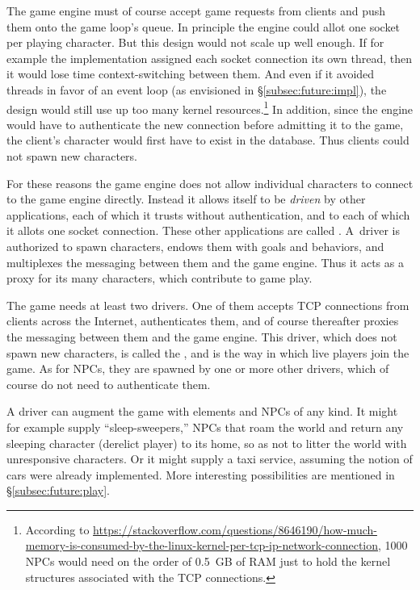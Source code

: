 The game engine must of course accept game requests from clients and push them
onto the game loop's queue.
In principle the engine could allot one socket per playing character.
But this design would not scale up well enough.
If for example the implementation assigned each socket connection its own
thread, then it would lose time context-switching between them.
And even if it avoided threads in favor of an event loop (as envisioned in
\S\ref{subsec:future:impl}), the design would still use up too many kernel
resources.\footnote{According to
\url{https://stackoverflow.com/questions/8646190/how-much-memory-is-consumed-by-the-linux-kernel-per-tcp-ip-network-connection},
1000 NPCs would need on the order of 0.5~GB of RAM just to hold the kernel
structures associated with the TCP connections.}
In addition, since the engine would have to authenticate the new connection
before admitting it to the game, the client's character would first have to
exist in the database.
Thus clients could not spawn new characters.

For these reasons the game engine does not allow individual characters to
connect to the game engine directly.
Instead it allows itself to be {\em driven} by other applications, each of
which it trusts without authentication, and to each of which it allots one
socket connection.
These other applications are called .
A~driver is authorized to spawn characters, endows them with goals and
behaviors, and multiplexes the messaging between them and the game engine.
Thus it acts as a proxy for its many characters, which contribute to game play.

The game needs at least two drivers.
One of them accepts TCP connections from clients across the Internet,
authenticates them, and of course thereafter proxies the messaging between them
and the game engine.
This driver, which does not spawn new characters, is called the , and is the way in which live players join the game.
As for NPCs, they are spawned by one or more other drivers, which of
course do not need to authenticate them.

A driver can augment the game with elements and NPCs of any kind.
It might for example supply ``sleep-sweepers,'' NPCs that roam the world and
return any sleeping character (derelict player) to its home, so as not to
litter the world with unresponsive characters.
Or it might supply a taxi service, assuming the notion of cars were already
implemented.
More interesting possibilities are mentioned in \S\ref{subsec:future:play}.

